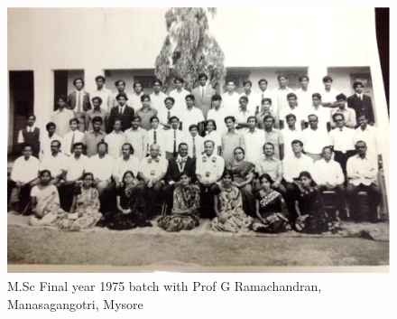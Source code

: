 \begin{figure}[H]
\centering
\includegraphics[scale=0.25]{src/images/chap8/8.eps}
\caption{M.Sc Final year 1975 batch with Prof G Ramachandran, Manasagangotri, Mysore}
\end{figure}



